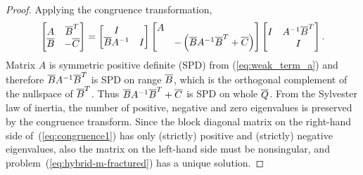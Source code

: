 \begin{proof}
Applying the congruence transformation,
\begin{equation}
\label{eq:congruence1}
\left[
\begin{matrix}
A        & \overline{B}^T  \\
\overline{B}   & -\overline{C}
\end{matrix}
\right]
=
\left[
\begin{matrix}
I                 &   \\
\overline{B} A^{-1} & I
\end{matrix}
\right]
\left[
\begin{matrix}
A &   \\
& -\left( \overline{B}A^{-1}\overline{B}^T + \overline{C} \right)
\end{matrix}
\right]
\left[
\begin{matrix}
I    & A^{-1} \overline{B}^T \\
& I
\end{matrix}
\right].
\end{equation}
Matrix $A$ is symmetric positive definite (SPD) from (\ref{eq:weak_term_a})
and therefore  $\overline{B}A^{-1}\overline{B}^T$ is SPD on range $\overline{B}$, which is 
the orthogonal complement of the nullspace of $\overline{B}^T$.
Thus $\overline{B}A^{-1}\overline{B}^T + \overline{C}$ is SPD on whole $\overline{Q}$.
From the Sylvester law of inertia, the number of positive, negative and zero 
eigenvalues is preserved by the congruence transform.
Since the block diagonal matrix on the right-hand side of~(\ref{eq:congruence1}) has only (strictly) positive and (strictly) negative eigenvalues,
also the matrix on the left-hand side must be nonsingular,
and problem~(\ref{eq:hybrid-m-fractured}) has a unique solution.


\end{proof}

